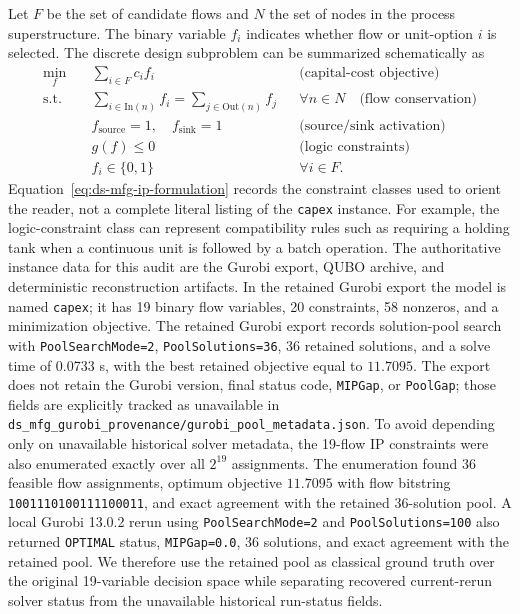 Let $F$ be the set of candidate flows and $N$ the set of nodes in the process
superstructure. The binary variable $f_i$ indicates whether flow or unit-option
$i$ is selected. The discrete design subproblem can be summarized
schematically as
\begin{equation}
\begin{aligned}
\min_{f} \quad & \sum_{i \in F} c_i f_i
    && \text{(capital-cost objective)} \\
\text{s.t.}\quad
& \sum_{i \in \mathrm{In}(n)} f_i
  = \sum_{j \in \mathrm{Out}(n)} f_j
    && \forall n \in N \quad \text{(flow conservation)} \\
& f_{\mathrm{source}} = 1,\quad f_{\mathrm{sink}} = 1
    && \text{(source/sink activation)} \\
& g(f) \leq 0
    && \text{(logic constraints)} \\
& f_i \in \{0,1\}
    && \forall i \in F .
\end{aligned}
\label{eq:ds-mfg-ip-formulation}
\end{equation}
Equation~\eqref{eq:ds-mfg-ip-formulation} records the constraint classes used
to orient the reader, not a complete literal listing of the \texttt{capex}
instance. For example, the logic-constraint class can represent compatibility
rules such as requiring a holding tank when a continuous unit is followed by a
batch operation. The authoritative instance data for this audit are the Gurobi
export, QUBO archive, and deterministic reconstruction artifacts. In the
retained Gurobi export the model is named \texttt{capex}; it has 19 binary flow
variables, 20 constraints, 58 nonzeros, and a minimization objective. The
retained Gurobi export records solution-pool search with
\texttt{PoolSearchMode=2}, \texttt{PoolSolutions=36}, 36 retained solutions, and
a solve time of 0.0733 s, with the best retained objective equal to $11.7095$.
The export does not retain the Gurobi version, final status code,
\texttt{MIPGap}, or \texttt{PoolGap}; those fields are explicitly tracked as
unavailable in
\texttt{ds\_mfg\_gurobi\_provenance/gurobi\_pool\_metadata.json}. To avoid
depending only on unavailable historical solver metadata, the 19-flow IP
constraints were also enumerated exactly over all $2^{19}$ assignments. The
enumeration found 36 feasible flow assignments, optimum objective $11.7095$ with
flow bitstring \texttt{1001110100111100011}, and exact agreement with the
retained 36-solution pool. A local Gurobi 13.0.2 rerun using
\texttt{PoolSearchMode=2} and \texttt{PoolSolutions=100} also returned
\texttt{OPTIMAL} status, \texttt{MIPGap=0.0}, 36 solutions, and exact agreement
with the retained pool. We therefore use the retained pool as classical ground
truth over the original 19-variable decision space while separating recovered
current-rerun solver status from the unavailable historical run-status fields.

